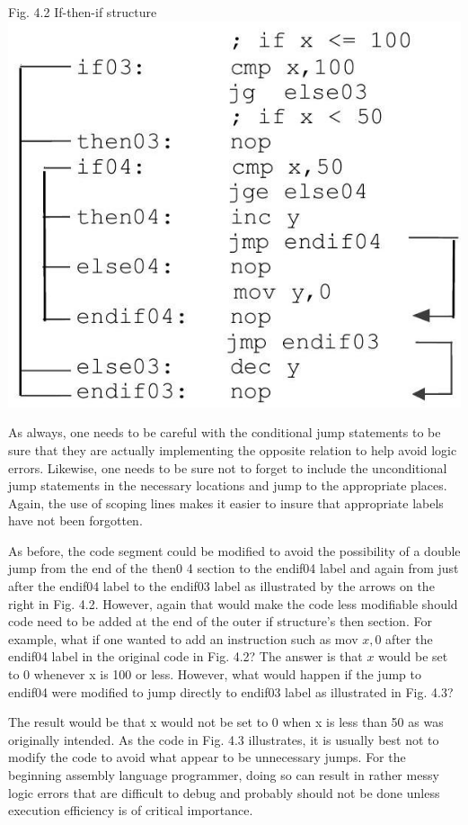 \documentclass[10pt]{article}
\begin{document}
Fig. 4.2 If-then-if structure\\
\includegraphics[max width=\textwidth, center]{2025_03_24_ebe50cc223a6fbc49eecg-072}

As always, one needs to be careful with the conditional jump statements to be sure that they are actually implementing the opposite relation to help avoid logic errors. Likewise, one needs to be sure not to forget to include the unconditional jump statements in the necessary locations and jump to the appropriate places. Again, the use of scoping lines makes it easier to insure that appropriate labels have not been forgotten.

As before, the code segment could be modified to avoid the possibility of a double jump from the end of the then0 4 section to the endif04 label and again from just after the endif04 label to the endif03 label as illustrated by the arrows on the right in Fig. 4.2. However, again that would make the code less modifiable should code need to be added at the end of the outer if structure's then section. For example, what if one wanted to add an instruction such as mov $x, 0$ after the endif04 label in the original code in Fig. 4.2? The answer is that $x$ would be set to 0 whenever x is 100 or less. However, what would happen if the jump to endif04 were modified to jump directly to endif03 label as illustrated in Fig. 4.3?

The result would be that x would not be set to 0 when x is less than 50 as was originally intended. As the code in Fig. 4.3 illustrates, it is usually best not to modify the code to avoid what appear to be unnecessary jumps. For the beginning assembly language programmer, doing so can result in rather messy logic errors that are difficult to debug and probably should not be done unless execution efficiency is of critical importance.
\end{document}
